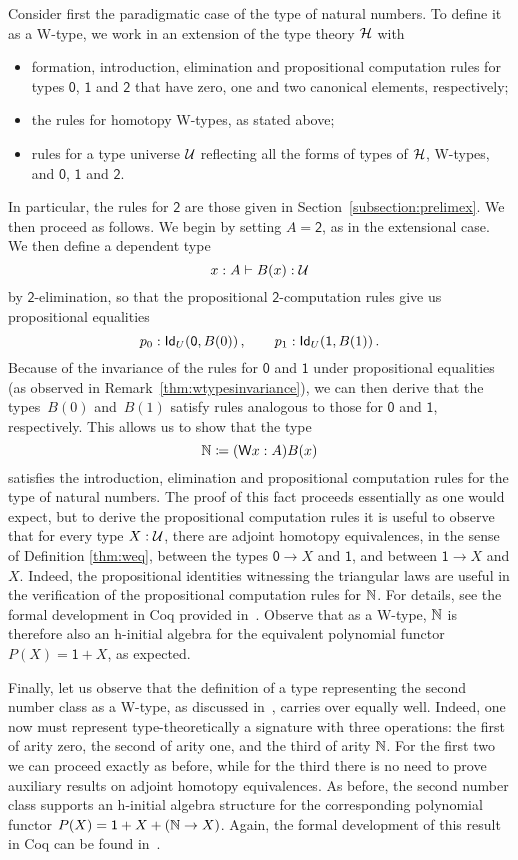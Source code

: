 Consider first the paradigmatic case of the type of natural numbers. To define it as a W-type, we work in an extension of the type theory $\mathcal{H}$ with
\begin{itemize}
\item formation, introduction, elimination and propositional computation rules 
for types $\mathsf{0}$, $\mathsf{1}$ and $\mathsf{2}$ that have zero, one and two canonical elements,
respectively; 
\item the rules for homotopy W-types, as stated above;
\item rules for a type universe $\mathcal{U}$ reflecting all the forms of types of $\mathcal{H}$, W-types, and
$\mathsf{0}$, $\mathsf{1}$ and $\mathsf{2}$.
\end{itemize}
In particular, the rules for $\mathsf{2}$ are those given in Section~\ref{subsection:prelimex}.
We then proceed as follows. We begin by setting $A =\mathsf{2}$, as in the extensional case.  
We then define a dependent type
\[
x : A \vdash B(x) : \mathcal{U}
\]
by $\mathsf{2}$-elimination, so that the propositional $\mathsf{2}$-computation rules give us 
propositional equalities
\[
 p_0 : \mathsf{Id}_{U}( \mathsf{0}, B(0)) \, , \qquad
 p_1 : \mathsf{Id}_{U}( \mathsf{1}, B(1)) \, .
\]
Because of the invariance of the rules for $\mathsf{0}$ and $\mathsf{1}$ under propositional
equalities (as observed in Remark~\ref{thm:wtypesinvariance}), we can then derive that the types~$B(0)$ and~$B(1)$ satisfy rules analogous to those for $\mathsf{0}$ and $\mathsf{1}$, respectively. This allows us to show that the type 
\[
\mathbb{N} \coloneqq (\mathsf{W} x : A) B(x)
\]
satisfies the introduction, elimination and propositional computation rules for the type of natural numbers. 
The proof of this fact proceeds essentially as one would expect, but to derive the propositional computation rules it
is useful to observe that for every type $X : \mathcal{U}$, there are adjoint homotopy equivalences,
in the sense of Definition \ref{thm:weq}, between the types $\mathsf{0}  \rightarrow X$ and $\mathsf{1}$, 
and between $\mathsf{1} \rightarrow X$ and $X$. Indeed, the propositional identities witnessing 
the triangular laws are useful in the verification of the propositional computation rules for $\mathbb{N}$. For 
details, see the formal development in Coq provided in~\cite{AwodeyS:indtht}.  Observe that as a W-type, $\mathbb{N}$ is therefore also an h-initial algebra for the equivalent polynomial functor $P(X) = \mathsf{1}+ X$, as expected.

Finally, let us observe that the definition of a type representing the second number class as a W-type,
as discussed in~\cite{MartinLofP:inttt}, carries over equally well. Indeed, one
now must represent type-theoretically a signature with three operations: the first of arity zero, 
the second of arity one, and the third of arity $\mathbb{N}$. For the first two we can proceed exactly as
before, while for the third there is no need to prove auxiliary results on adjoint homotopy 
equivalences. As before, the second number class supports an h-initial algebra structure for the corresponding polynomial functor $P(X) = \mathsf{1} + X + (\mathbb{N} \rightarrow X)$.
Again, the formal development of this result in Coq can be found in~\cite{AwodeyS:indtht}.



